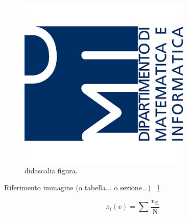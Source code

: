 \begin{figure}[H]
	\centering
    \includegraphics[width=8.2cm, keepaspectratio]{img/logoDMI.jpg}
	\caption{didascalia figura.}\label{fig:esempio}
\end{figure}


Riferimento immagine (o tabella... o sezione...) ~\ref{fig:esempio}

\vspace{0.5 cm}

\begin{equation} \label{eq:jo}
\pi_i(v) = \sum \frac{x_{S_i}}{\mathrm{N}}
\end{equation}
\vspace{0.5 cm}




